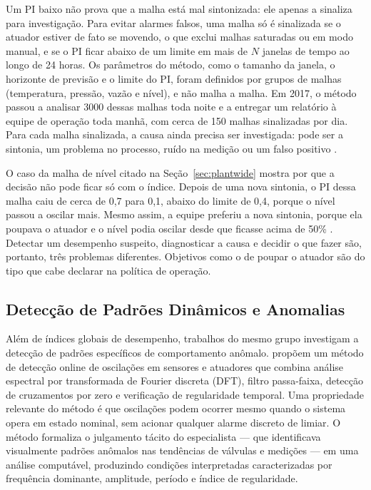 Um PI baixo não prova que a malha está mal sintonizada: ele apenas a sinaliza para investigação. Para evitar alarmes falsos, uma malha só é sinalizada se o atuador estiver de fato se movendo, o que exclui malhas saturadas ou em modo manual, e se o PI ficar abaixo de um limite em mais de $N$ janelas de tempo ao longo de 24 horas. Os parâmetros do método, como o tamanho da janela, o horizonte de previsão e o limite do PI, foram definidos por grupos de malhas (temperatura, pressão, vazão e nível), e não malha a malha. Em 2017, o método passou a analisar 3000 dessas malhas toda noite e a entregar um relatório à equipe de operação toda manhã, com cerca de 150 malhas sinalizadas por dia. Para cada malha sinalizada, a causa ainda precisa ser investigada: pode ser a sintonia, um problema no processo, ruído na medição ou um falso positivo \cite{Bradu2018}.

O caso da malha de nível citado na Seção~\ref{sec:plantwide} mostra por que a decisão não pode ficar só com o índice. Depois de uma nova sintonia, o PI dessa malha caiu de cerca de 0,7 para 0,1, abaixo do limite de 0,4, porque o nível passou a oscilar mais. Mesmo assim, a equipe preferiu a nova sintonia, porque ela poupava o atuador e o nível podia oscilar desde que ficasse acima de 50\% \cite{Bradu2018}. Detectar um desempenho suspeito, diagnosticar a causa e decidir o que fazer são, portanto, três problemas diferentes. Objetivos como o de poupar o atuador são do tipo que cabe declarar na política de operação.

\subsection{Detecção de Padrões Dinâmicos e Anomalias}

Além de índices globais de desempenho, trabalhos do mesmo grupo investigam a detecção de padrões específicos de comportamento anômalo.  propõem um método de detecção online de oscilações em sensores e atuadores que combina análise espectral por transformada de Fourier discreta (DFT), filtro passa-faixa, detecção de cruzamentos por zero e verificação de regularidade temporal. Uma propriedade relevante do método é que oscilações podem ocorrer mesmo quando o sistema opera em estado nominal, sem acionar qualquer alarme discreto de limiar. O método formaliza o julgamento tácito do especialista --- que identificava visualmente padrões anômalos nas tendências de válvulas e medições --- em uma análise computável, produzindo condições interpretadas caracterizadas por frequência dominante, amplitude, período e índice de regularidade.

